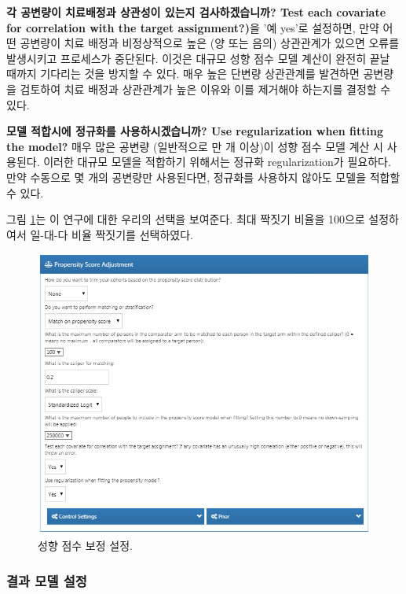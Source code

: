 \documentclass[10.5pt]{book}
\theoremstyle{definition}
\theoremstyle{definition}
\theoremstyle{definition}
\theoremstyle{remark}
\begin{document}
\textbf{각 공변량이 치료배정과 상관성이 있는지 검사하겠습니까? Test each
covariate for correlation with the target assignment?)}을 '예 yes'로
설정하면, 만약 어떤 공변량이 치료 배정과 비정상적으로 높은 (양 또는
음의) 상관관계가 있으면 오류를 발생시키고 프로세스가 중단된다. 이것은
대규모 성향 점수 모델 계산이 완전히 끝날 때까지 기다리는 것을 방지할 수
있다. 매우 높은 단변량 상관관계를 발견하면 공변량을 검토하여 치료 배정과
상관관계가 높은 이유와 이를 제거해야 하는지를 결정할 수 있다.

\textbf{모델 적합시에 정규화를 사용하시겠습니까? Use regularization when
fitting the model?} 매우 많은 공변량 (일반적으로 만 개 이상)이 성향 점수
모델 계산 시 사용된다. 이러한 대규모 모델을 적합하기 위해서는 정규화
regularization가 필요하다. 만약 수동으로 몇 개의 공변량만 사용된다면,
정규화를 사용하지 않아도 모델을 적합할 수 있다.

그림 \ref{fig:psSettings}는 이 연구에 대한 우리의 선택을 보여준다. 최대
짝짓기 비율을 100으로 설정하여서 일-대-다 비율 짝짓기를 선택하였다.

\begin{figure}

{\centering \includegraphics[width=1\linewidth]{images/PopulationLevelEstimation/psSettings} 

}

\caption{성향 점수 보정 설정.}\label{fig:psSettings}
\end{figure}

\subsubsection*{결과 모델 설정}\label{--}
\end{document}
